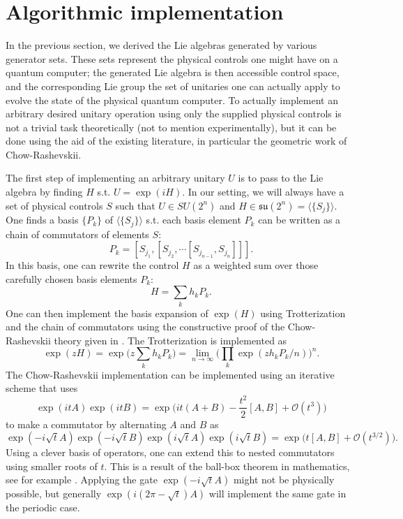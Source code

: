 \documentclass[12pt, a4-paper]{amsart}
\newcommand{\cO}{\mathcal{O}}
\newcommand{\mf}[1]{\mathfrak{#1}}
\numberwithin{equation}{section}
\begin{document}
\section{Algorithmic implementation} \label{sec:algorithmic_implementation}
In the previous section, we derived the Lie algebras generated by various generator sets. These sets represent the physical controls one might have on a quantum computer; the generated Lie algebra is then accessible control space, and the corresponding Lie group the set of unitaries one can actually apply to evolve the state of the physical quantum computer. To actually implement an arbitrary desired unitary operation using only the supplied physical controls is not a trivial task theoretically (not to mention experimentally), but it can be done using the aid of the existing literature, in particular the geometric work of Chow-Rashevskii.

The first step of implementing an arbitrary unitary $U$ is to pass to the Lie algebra by finding $H$ s.t. $U = \exp(iH)$. In our setting, we will always have a set of physical controls $S$ such that $U \in SU(2^n)$ and $H \in \mf{su}(2^n) = \langle \{S_j\} \rangle$. One finds a basis $\{P_k\}$ of $\langle \{S_j\} \rangle$ s.t. each basis element $P_k$ can be written as a chain of commutators of elements $S$:
\begin{equation}
    P_k = [S_{j_1}, [S_{j_2}, \cdots [S_{j_{n-1}}, S_{j_n}]]].
\end{equation}
In this basis, one can rewrite the control $H$ as a weighted sum over those carefully chosen basis elements $P_k$:
\begin{equation}
    H = \sum_k h_k P_k.
\end{equation} 
One can then implement the basis expansion of $\exp(H)$ using Trotterization and the chain of commutators using the constructive proof of the Chow-Rashevskii theory given in \cite{Giannotti2024ProvingRashevskii}. The Trotterization is implemented as
\begin{equation}
    \exp(zH) = \exp\big(z\sum_k h_k P_k\big) = \lim_{n\to \infty} \Big(\prod_k \exp(z h_k P_k/n) \Big)^n.
\end{equation}
The Chow-Rashevskii implementation can be implemented using an iterative scheme that uses
\begin{equation}
    \exp(itA)\exp(itB) = \exp\big( it(A+B) - \frac{t^2}{2}[A,B] + \cO(t^3)\big)
\end{equation}
to make a commutator by alternating $A$ and $B$ as
\begin{equation}
    \exp(-i\sqrt{t}A)\exp(-i\sqrt{t}B)\exp(i\sqrt{t}A)\exp(i\sqrt{t}B) = \exp\big(t[A,B] + \cO(t^{3/2})\big).
\end{equation}
Using a clever basis of operators, one can extend this to nested commutators using smaller roots of $t$. This is a result of the ball-box theorem in mathematics, see for example \cite{Nagel1985}. Applying the gate $\exp(-i\sqrt{t}A)$ might not be physically possible, but generally $\exp(i(2\pi - \sqrt{t})A)$ will implement the same gate in the periodic case. 
\end{document}
